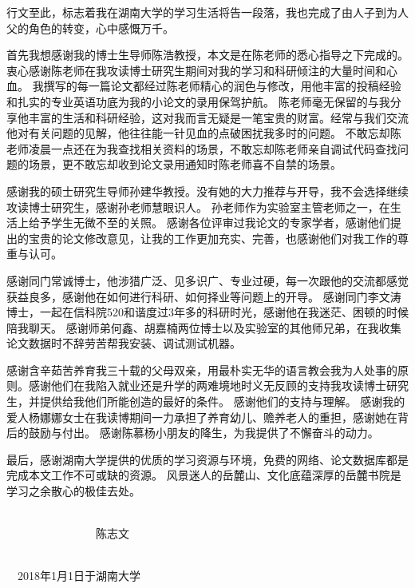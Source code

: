 \begin{acknowledgements}
行文至此，标志着我在湖南大学的学习生活将告一段落，我也完成了由人子到为人父的角色的转变，心中感慨万千。

首先我想感谢我的博士生导师陈浩教授，本文是在陈老师的悉心指导之下完成的。
衷心感谢陈老师在我攻读博士研究生期间对我的学习和科研倾注的大量时间和心血。
我撰写的每一篇论文都经过陈老师精心的润色与修改，用他丰富的投稿经验和扎实的专业英语功底为我的小论文的录用保驾护航。
陈老师毫无保留的与我分享他丰富的生活和科研经验，这对我而言无疑是一笔宝贵的财富。经常与我们交流他对有关问题的见解，他往往能一针见血的点破困扰我多时的问题。
不敢忘却陈老师凌晨一点还在为我查找相关资料的场景，不敢忘却陈老师亲自调试代码查找问题的场景，更不敢忘却收到论文录用通知时陈老师喜不自禁的场景。

感谢我的硕士研究生导师孙建华教授。没有她的大力推荐与开导，我不会选择继续攻读博士研究生，感谢孙老师慧眼识人。
孙老师作为实验室主管老师之一，在生活上给予学生无微不至的关照。
感谢各位评审过我论文的专家学者，感谢他们提出的宝贵的论文修改意见，让我的工作更加充实、完善，也感谢他们对我工作的尊重与认可。

感谢同门常诚博士，他涉猎广泛、见多识广、专业过硬，每一次跟他的交流都感觉获益良多，感谢他在如何进行科研、如何择业等问题上的开导。
感谢同门李文涛博士，一起在信科院520和谐度过3年多的科研时光，感谢他在我迷茫、困顿的时候陪我聊天。
感谢师弟何鑫、胡嘉楠两位博士以及实验室的其他师兄弟，在我收集论文数据时不辞劳苦帮我安装、调试测试机器。

感谢含辛茹苦养育我三十载的父母双亲，用最朴实无华的语言教会我为人处事的原则。感谢他们在我陷入就业还是升学的两难境地时义无反顾的支持我攻读博士研究生，并提供给我他们所能创造的最好的条件。
感谢他们的支持与理解。
感谢我的爱人杨娜娜女士在我读博期间一力承担了养育幼儿、赡养老人的重担，感谢她在背后的鼓励与付出。
感谢陈慕杨小朋友的降生，为我提供了不懈奋斗的动力。

最后，感谢湖南大学提供的优质的学习资源与环境，免费的网络、论文数据库都是完成本文工作不可或缺的资源。
风景迷人的岳麓山、文化底蕴深厚的岳麓书院是学习之余散心的极佳去处。
~
~

~~~~~~~~~~~~~~~~~~~~~~~~~~~~~~~~~~~~~~~~~~~~~~~~~~~~~~~~~~~~~~~~~~~~~~~~~~~~~~~~~~~~~~~~陈志文

~~~~~~~~~~~~~~~~~~~~~~~~~~~~~~~~~~~~~~~~~~~~~~~~~~~~~~~~~~~~~~~~~~~~~~~~~~2018年1月1日于湖南大学
\end{acknowledgements}

